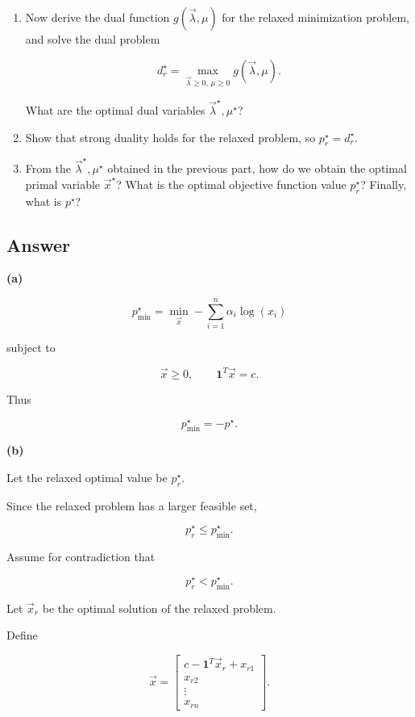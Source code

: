 \documentclass[
	12pt,
]{fphw}
\begin{document}
\begin{enumerate}
\item[(d)] Now derive the dual function $g(\vec{\lambda}, \mu)$ for the relaxed minimization problem, and solve the dual problem

\[
d^\star_r = \max_{\vec{\lambda} \ge 0,\, \mu \ge 0} g(\vec{\lambda}, \mu).
\]

What are the optimal dual variables $\vec{\lambda}^\star, \mu^\star$?

\item[(e)] Show that strong duality holds for the relaxed problem, so $p^\star_r = d^\star_r$.

\item[(f)] From the $\vec{\lambda}^\star, \mu^\star$ obtained in the previous part, how do we obtain the optimal primal variable $\vec{x}^\star$? What is the optimal objective function value $p^\star_r$? Finally, what is $p^\star$?

\end{enumerate}

\subsection*{Answer}

\textbf{(a)}

\[
p^\star_{\min}
=
\min_{\vec{x}} -\sum_{i=1}^n \alpha_i \log(x_i)
\]

subject to

\[
\vec{x} \ge 0, \qquad \mathbf{1}^T\vec{x} = c.
\]

Thus

\[
p^\star_{\min} = -p^\star.
\]

\textbf{(b)}

Let the relaxed optimal value be $p_r^\star$.

Since the relaxed problem has a larger feasible set,

\[
p_r^\star \le p_{\min}^\star.
\]

Assume for contradiction that

\[
p_r^\star < p_{\min}^\star.
\]

Let $\vec{x}_r$ be the optimal solution of the relaxed problem.

Define

\[
\vec{x} =
\begin{bmatrix}
c - \mathbf{1}^T\vec{x}_r + x_{r1} \\
x_{r2} \\
\vdots \\
x_{rn}
\end{bmatrix}.
\]
\end{document}
